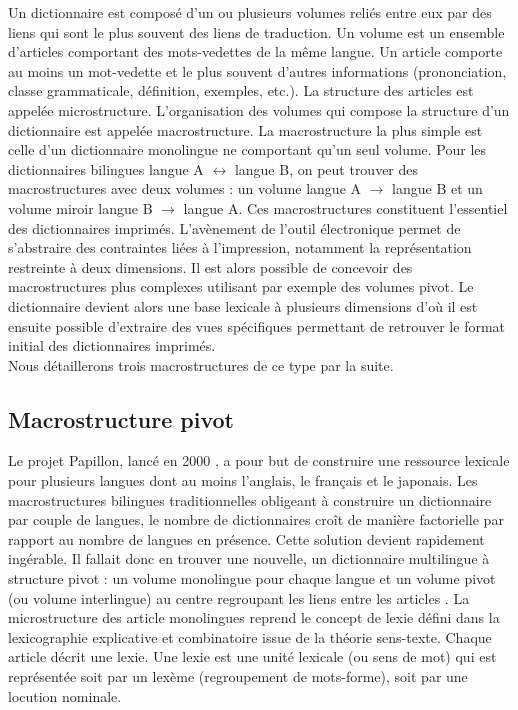 \documentclass[10pt,a4paper,twoside]{article}
\begin{document}
Un dictionnaire est composé d'un ou plusieurs volumes reliés entre eux par des liens qui sont le plus souvent des liens de traduction. Un volume est un ensemble d'articles comportant des mots-vedettes de la même langue. Un article comporte au moins un mot-vedette et le plus souvent d'autres informations (prononciation, classe grammaticale, définition, exemples, etc.). La structure des articles est appelée microstructure. L'organisation des volumes qui compose la structure d'un dictionnaire est appelée macrostructure. La macrostructure la plus simple est celle d'un dictionnaire monolingue ne comportant qu'un seul volume. Pour les dictionnaires bilingues langue A \ensuremath{\leftrightarrow} langue B, on peut trouver des macrostructures avec deux volumes : un volume langue A \ensuremath{\to} langue B et un volume miroir langue B \ensuremath{\to} langue A. Ces macrostructures constituent l'essentiel des dictionnaires imprimés. L'avènement de l'outil électronique permet de s'abstraire des contraintes liées à l'impression, notamment la représentation restreinte à deux dimensions. Il est alors possible de concevoir des macrostructures plus complexes utilisant par exemple des volumes pivot. Le dictionnaire devient alors une base lexicale à plusieurs dimensions d'où il est ensuite possible d'extraire des vues spécifiques permettant de retrouver le format initial des dictionnaires imprimés. \\
Nous détaillerons trois macrostructures de ce type par la suite.

\subsection{Macrostructure pivot}

Le projet Papillon, lancé en 2000 \cite{MTMMEP00}, a pour but de construire une ressource lexicale pour plusieurs langues dont au moins l'anglais, le français et le japonais. Les macrostructures bilingues traditionnelles obligeant à construire un dictionnaire par couple de langues, le nombre de dictionnaires croît de manière factorielle par rapport au nombre de langues en présence. Cette solution devient rapidement ingérable. Il fallait donc en trouver une nouvelle, un dictionnaire multilingue à structure pivot : un volume monolingue pour chaque langue et un volume pivot (ou volume interlingue) au centre regroupant les liens entre les articles \cite{GSMM01a}. La microstructure des article monolingues reprend le concept de lexie défini dans la lexicographie explicative et combinatoire \cite{MelcukClasPolguere95} issue de la théorie sens-texte. Chaque article décrit une lexie. Une lexie est une unité lexicale (ou sens de mot) qui est représentée soit par un lexème (regroupement de mots-forme), soit par une locution nominale. \\
\end{document}

